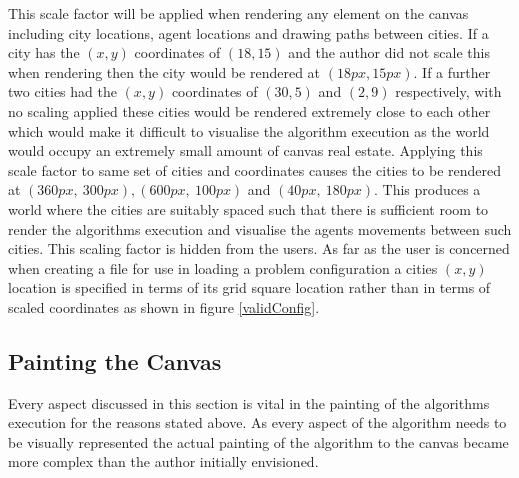 This scale factor will be applied when rendering any element on the canvas including city locations, agent locations and drawing paths between cities. If a city has the $(x,y)$ coordinates of $(18, 15)$ and the author did not scale this when rendering then the city would be rendered at $(18px,15px)$. If a further two cities had the $(x,y)$ coordinates of $(30, 5)$ and $(2, 9)$ respectively, with no scaling applied these cities would be rendered extremely close to each other which would make it difficult to visualise the algorithm execution as the world would occupy an extremely small amount of canvas real estate. Applying this scale factor to same set of cities and coordinates causes the cities to be rendered at $(360px,\ 300px), (600px,\ 100px)$ and $(40px,\ 180px)$. This produces a world where the cities are suitably spaced such that there is sufficient room to render the algorithms execution and visualise the agents movements between such cities. This scaling factor is hidden from the users. As far as the user is concerned when creating a file for use in loading a problem configuration a cities $(x,y)$ location is specified in terms of its grid square location rather than in terms of scaled coordinates as shown in figure \ref{validConfig}.

\subsection{Painting the Canvas}

Every aspect discussed in this section is vital in the painting of the algorithms execution for the reasons stated above. As every aspect of the algorithm needs to be visually represented the actual painting of the algorithm to the canvas became more complex than the author initially envisioned. 

